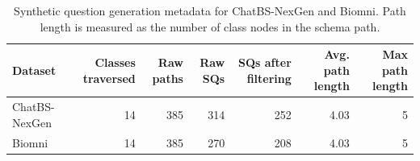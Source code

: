\begin{table}[t]
\centering
\caption{Synthetic question generation metadata for ChatBS-NexGen and Biomni. Path length is measured as the number of class nodes in the schema path.}
\label{tab:sq-generation-metadata}
\scriptsize
\begin{tabular}{lrrrrrr}
\toprule
Dataset & Classes traversed & Raw paths & Raw SQs & SQs after filtering & Avg. path length & Max path length \\
\midrule
ChatBS-NexGen & 14 & 385 & 314 & 252 & 4.03 & 5 \\
Biomni & 14 & 385 & 270 & 208 & 4.03 & 5 \\
\bottomrule
\end{tabular}
\end{table}
